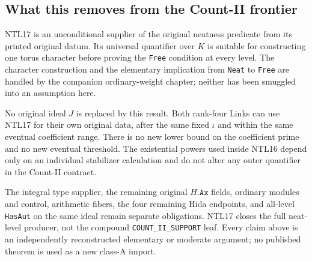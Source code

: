\subsection{What this removes from the Count-II frontier}

NTL17 is an unconditional supplier of the original neatness predicate
from its printed original datum.  Its universal quantifier over
\(K\) is suitable for constructing one torus character before proving
the \texttt{Free} condition at every level.  The character construction
and the elementary implication from \texttt{Neat} to \texttt{Free}
are handled by the companion ordinary-weight chapter; neither has
been smuggled into an assumption here.

No original ideal \(J\) is replaced by this result.  Both rank-four
Links can use NTL17 for their own original data, after the same fixed
\(\iota\) and within the same eventual coefficient range.  There is
no new lower bound on the coefficient prime and no new eventual
threshold.  The existential powers used inside NTL16 depend only
on an individual stabilizer calculation and do not alter any outer
quantifier in the Count-II contract.

The integral type supplier, the remaining original \(H.\texttt{Ax}\)
fields, ordinary modules and control, arithmetic fibers, the four
remaining Hida endpoints, and all-level \texttt{HasAut} on the same
ideal remain separate obligations.  NTL17 closes the full neat-level
producer, not the compound \texttt{COUNT\_II\_SUPPORT} leaf.  Every
claim above is an independently reconstructed elementary or moderate
argument; no published theorem is used as a new class-A import.
